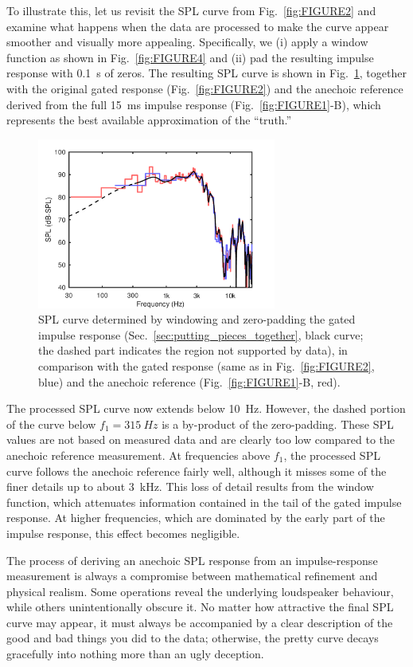 \documentclass[12pt,a4paper]{article}
\providecommand{\secn}[1]{Sec.~\ref{sec:#1}}
\providecommand{\figlabel}[1]{\label{fig:#1}}
\providecommand{\figr}[1]{Fig.~\ref{fig:#1}}
\begin{document}
To illustrate this, let us revisit the SPL curve from \figr{FIGURE2} and examine what happens when the data are processed to make the curve appear smoother and visually more appealing. Specifically, we (i) apply a window function as shown in \figr{FIGURE4} and (ii) pad the resulting impulse response with \SI{0.1}{s} of zeros. The resulting SPL curve is shown in \figr{FIGURE5}, together with the original gated response (\figr{FIGURE2}) and the anechoic reference derived from the full \SI{15}{ms} impulse response (\mbox{\figr{FIGURE1}-B}), which represents the best available approximation of the “truth.”

\begin{figure}[tbp]
  \begin{center}
    \includegraphics[width=0.7\textwidth]{FIGURE5}
    \caption{SPL curve determined by windowing and zero-padding the gated impulse response (\secn{putting_pieces_together}, black curve; the dashed part indicates the region not supported by data), in comparison with the gated response (same as in \figr{FIGURE2}, blue) and the anechoic reference (\mbox{\figr{FIGURE1}-B}, red).}
    \figlabel{FIGURE5}
  \end{center}
\end{figure}

The processed SPL curve now extends below \SI{10}{Hz}. However, the dashed portion of the curve below $f_1 = \SI{315}{Hz}$ is a by-product of the zero-padding. These SPL values are not based on measured data and are clearly too low compared to the anechoic reference measurement. At frequencies above $f_1$, the processed SPL curve follows the anechoic reference fairly well, although it misses some of the finer details up to about \SI{3}{kHz}. This loss of detail results from the window function, which attenuates information contained in the tail of the gated impulse response. At higher frequencies, which are dominated by the early part of the impulse response, this effect becomes negligible.

The process of deriving an anechoic SPL response from an impulse-response measurement is always a compromise between mathematical refinement and physical realism. Some operations reveal the underlying loudspeaker behaviour, while others unintentionally obscure it. No matter how attractive the final SPL curve may appear, it must always be accompanied by a clear description of the good and bad things you did to the data; otherwise, the pretty curve decays gracefully into nothing more than an ugly deception.
\end{document}
